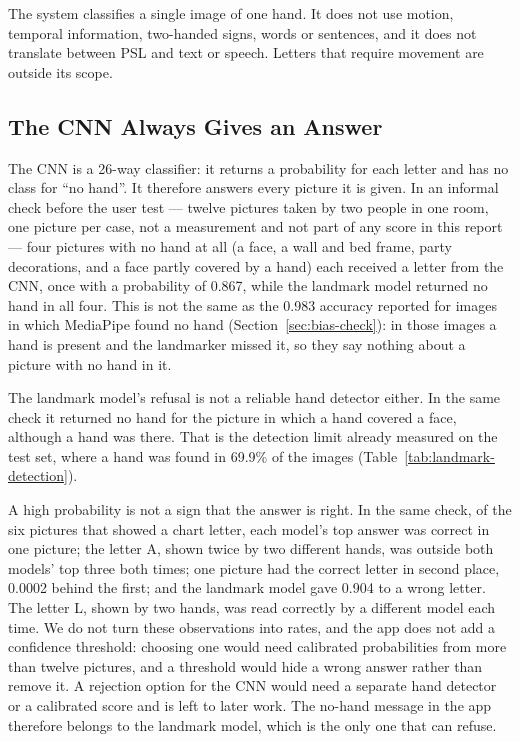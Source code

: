 The system classifies a single image of one hand. It does not use motion, temporal information, two-handed signs, words or sentences, and it does not translate between PSL and text or speech. Letters that require movement are outside its scope.

\subsection{The CNN Always Gives an Answer}

The CNN is a 26-way classifier: it returns a probability for each letter and has no class for ``no hand''. It therefore answers every picture it is given. In an informal check before the user test --- twelve pictures taken by two people in one room, one picture per case, not a measurement and not part of any score in this report --- four pictures with no hand at all (a face, a wall and bed frame, party decorations, and a face partly covered by a hand) each received a letter from the CNN, once with a probability of 0.867, while the landmark model returned no hand in all four. This is not the same as the 0.983 accuracy reported for images in which MediaPipe found no hand (Section~\ref{sec:bias-check}): in those images a hand is present and the landmarker missed it, so they say nothing about a picture with no hand in it.

The landmark model's refusal is not a reliable hand detector either. In the same check it returned no hand for the picture in which a hand covered a face, although a hand was there. That is the detection limit already measured on the test set, where a hand was found in 69.9\% of the images (Table~\ref{tab:landmark-detection}).

A high probability is not a sign that the answer is right. In the same check, of the six pictures that showed a chart letter, each model's top answer was correct in one picture; the letter A, shown twice by two different hands, was outside both models' top three both times; one picture had the correct letter in second place, 0.0002 behind the first; and the landmark model gave 0.904 to a wrong letter. The letter L, shown by two hands, was read correctly by a different model each time. We do not turn these observations into rates, and the app does not add a confidence threshold: choosing one would need calibrated probabilities from more than twelve pictures, and a threshold would hide a wrong answer rather than remove it. A rejection option for the CNN would need a separate hand detector or a calibrated score and is left to later work. The no-hand message in the app therefore belongs to the landmark model, which is the only one that can refuse.

